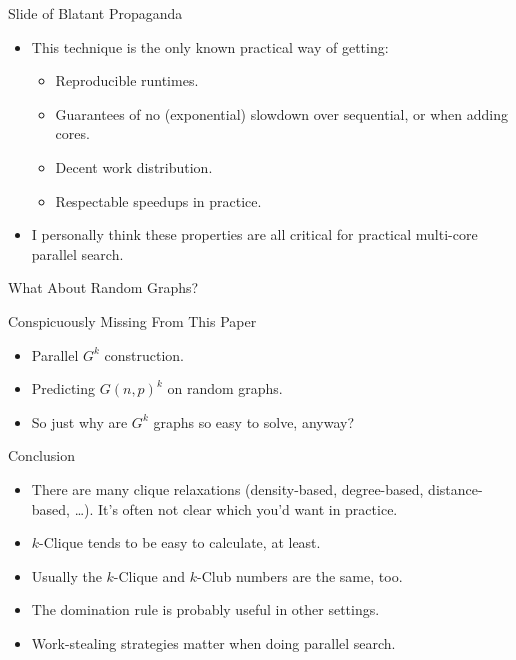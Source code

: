 \documentclass{beamer}
\begin{document}
\begin{frame}{Slide of Blatant Propaganda}
    \begin{itemize}
        \item This technique is the only known practical way of getting:
            \begin{itemize}
                \item Reproducible runtimes.
                \item Guarantees of no (exponential) slowdown over sequential, or when adding cores.
                \item Decent work distribution.
                \item Respectable speedups in practice.
            \end{itemize}
        \item I personally think these properties are all critical for practical multi-core parallel
            search.
    \end{itemize}
\end{frame}

\begin{frame}{What About Random Graphs?}
    \centering
    
\end{frame}

\begin{frame}{Conspicuously Missing From This Paper}
    \begin{itemize}
        \item Parallel $G^k$ construction.
        \item Predicting $G(n, p)^k$ on random graphs.
        \item So just why are $G^k$ graphs so easy to solve, anyway?
    \end{itemize}
\end{frame}


\begin{frame}{Conclusion}
    \begin{itemize}
        \item There are many clique relaxations (density-based, degree-based, distance-based,
            \ldots). It's often not clear which you'd want in practice.
        \item $k$-Clique tends to be easy to calculate, at least.
        \item Usually the $k$-Clique and $k$-Club numbers are the same, too.
        \item The domination rule is probably useful in other settings.
        \item Work-stealing strategies matter when doing parallel search.
    \end{itemize}
\end{frame}
\end{document}
